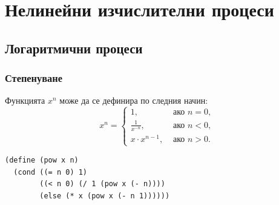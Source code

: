 \documentclass{beamer}
\begin{document}
\section{Нелинейни изчислителни процеси}

\subsection{Логаритмични процеси}

\begin{frame}[fragile]
  \frametitle{Степенуване}

  Функцията $x^n$ може да се дефинира по следния начин:
  \begin{equation*}
    x^n = \begin{cases}
      1,&\text{ ако }n = 0,\\
      \frac 1 {x^{-n}},&\text{ ако }n < 0,\\
      x\cdot x^{n-1},&\text{ ако }n > 0.
    \end{cases}
  \end{equation*}
  \pause
\begin{lstlisting}
(define (pow x n)
  (cond ((= n 0) 1)
        ((< n 0) (/ 1 (pow x (- n))))
        (else (* x (pow x (- n 1))))))
\end{lstlisting}
\end{frame}
\end{document}
